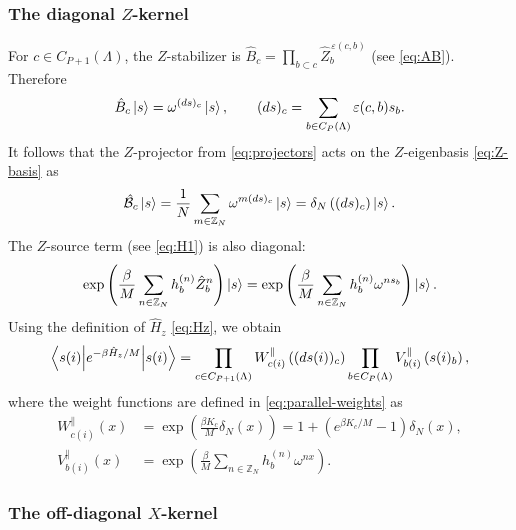 \subsubsection{The diagonal \(Z\)-kernel}

For \(c\in C_{P+1}(\Lambda)\), the $Z$-stabilizer is $\hat B_c=\prod_{b\subset c}\hat Z_b^{\,\varepsilon(c,b)}$ (see \eqref{eq:AB}).
Therefore
\begin{equation}
	\hat B_c\ket{s}
	=
	\omega^{(ds)_c}\ket{s},
	\qquad
	(ds)_c
	=
	\sum_{b\in C_P(\Lambda)}\varepsilon(c,b)s_b.
	\label{eq:Bc-eigenvalue}
\end{equation}
It follows that the $Z$-projector from \eqref{eq:projectors} acts on the $Z$-eigenbasis \eqref{eq:Z-basis} as
\begin{equation}
	\hat{\mathcal B}_c\ket{s}
	=
	\frac1N\sum_{m\in\mathbb Z_N}\omega^{m(ds)_c}\ket{s}
	=
	\delta_N\left((ds)_c\right)\ket{s}.
	\label{eq:Bproj-eigenvalue}
\end{equation}
The \(Z\)-source term (see \eqref{eq:H1}) is also diagonal:
\begin{equation}
	\exp\left(
	\frac{\beta}{M}\sum_{n\in\mathbb Z_N}h_b^{(n)}\hat Z_b^n
	\right)\ket{s}
	=
	\exp\left(
	\frac{\beta}{M}\sum_{n\in\mathbb Z_N}h_b^{(n)}\omega^{n s_b}
	\right)\ket{s}.
	\label{eq:h-source-diagonal}
\end{equation}
Using the definition of \(\hat H_z\) \eqref{eq:Hz}, we obtain
\begin{equation}
	\left\langle s(i) \middle| e^{-\beta\hat H_z/M} \middle| s(i) \right\rangle
	=
	\prod_{c\in C_{P+1}(\Lambda)}
	W_{c(i)}^{\parallel}\left((ds(i))_c\right)
	\prod_{b\in C_P(\Lambda)}
	V_{b(i)}^{\parallel}\left(s(i)_b\right),
	\label{eq:Hz-kernel}
\end{equation}
where the weight functions are defined in \eqref{eq:parallel-weights} as
\begin{subequations}
	\begin{align}
		W_{c(i)}^{\parallel}(x)
		&=
		\exp\left(\frac{\beta K_c}{M}\delta_N(x)\right)
		=
		1+\left(e^{\beta K_c/M}-1\right)\delta_N(x),
		\\
		V_{b(i)}^{\parallel}(x)
		&=
		\exp\left(
		\frac{\beta}{M}\sum_{n\in\mathbb Z_N}h_b^{(n)}\omega^{nx}
		\right).
	\end{align}
\end{subequations}

\subsubsection{The off-diagonal \(X\)-kernel}

